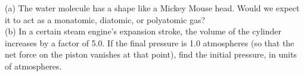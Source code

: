 (a) The water molecule has a shape like a Mickey Mouse head. Would we expect it to act
as a monatomic, diatomic, or polyatomic gas?\\
(b) In a certain steam engine's expansion stroke, the volume of the cylinder increases
by a factor of 5.0. If the final pressure is 1.0 atmospheres (so that the net force
on the piston vanishes at that point), find the initial pressure, in units of atmospheres.\answercheck\hwendpart
